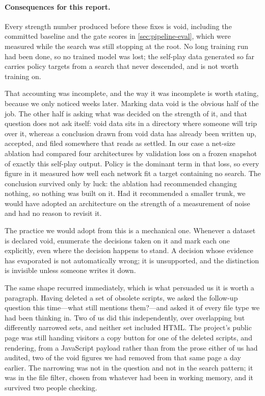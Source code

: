 \paragraph{Consequences for this report.}
Every strength number produced before these fixes is void, including the
committed baseline and the gate scores in \cref{sec:pipeline-eval}, which were
measured while the search was still stopping at the root. No long training run
had been done, so no trained model was lost; the self-play data generated so far
carries policy targets from a search that never descended, and is not worth
training on.

That accounting was incomplete, and the way it was incomplete is worth stating,
because we only noticed weeks later. Marking data void is the obvious half of
the job. The other half is asking what was decided on the strength of it, and
that question does not ask itself: void data sits in a directory where someone
will trip over it, whereas a conclusion drawn from void data has already been
written up, accepted, and filed somewhere that reads as settled. In our case a
net-size ablation had compared four architectures by validation loss on a frozen
snapshot of exactly this self-play output. Policy is the dominant term in that
loss, so every figure in it measured how well each network fit a target
containing no search. The conclusion survived only by luck: the ablation had
recommended changing nothing, so nothing was built on it. Had it recommended a
smaller trunk, we would have adopted an architecture on the strength of a
measurement of noise and had no reason to revisit it.

The practice we would adopt from this is a mechanical one. Whenever a dataset is
declared void, enumerate the decisions taken on it and mark each one explicitly,
even where the decision happens to stand. A decision whose evidence has
evaporated is not automatically wrong; it is unsupported, and the distinction is
invisible unless someone writes it down.

The same shape recurred immediately, which is what persuaded us it is worth a
paragraph. Having deleted a set of obsolete scripts, we asked the follow-up
question this time---what still mentions them?---and asked it of every file
type we had been thinking in. Two of us did this independently, over
overlapping but differently narrowed sets, and neither set included HTML. The
project's public page was still handing visitors a copy button for one of the
deleted scripts, and rendering, from a JavaScript payload rather than from the
prose either of us had audited, two of the void figures we had removed from that
same page a day earlier. The narrowing was not in the question and not in the
search pattern; it was in the file filter, chosen from whatever had been in
working memory, and it survived two people checking.

